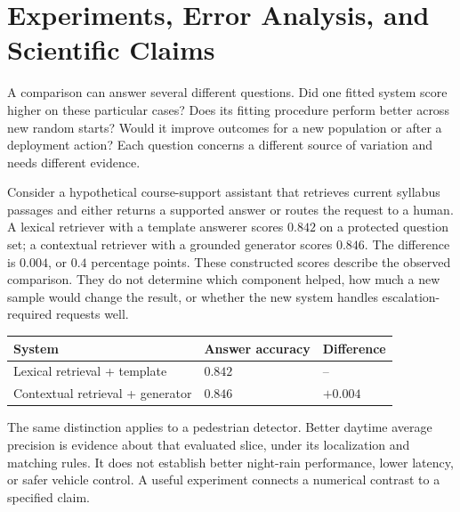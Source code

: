 \begingroup
\raggedbottom
{}
\chapter{Experiments, Error Analysis, and Scientific Claims}
\label{ch:experiments-claims}

A comparison can answer several different questions. Did one fitted system score higher on these particular cases? Does its fitting procedure perform better across new random starts? Would it improve outcomes for a new population or after a deployment action? Each question concerns a different source of variation and needs different evidence.

Consider a hypothetical course-support assistant that retrieves current syllabus passages and either returns a supported answer or routes the request to a human. A lexical retriever with a template answerer scores $0.842$ on a protected question set; a contextual retriever with a grounded generator scores $0.846$. The difference is $0.004$, or $0.4$ percentage points. These constructed scores describe the observed comparison. They do not determine which component helped, how much a new sample would change the result, or whether the new system handles escalation-required requests well.

\par\addvspace{\intextsep}\noindent\begin{minipage}{\linewidth}
\centering\small
\begin{tabular}{@{}L{5.6cm}L{2.3cm}L{1.8cm}@{}}
\toprule
System & Answer accuracy & Difference \\
\midrule
Lexical retrieval + template & $0.842$ & -- \\
Contextual retrieval + generator & $0.846$ & $+0.004$ \\
\bottomrule
\end{tabular}
\label{tab:score-improved-so-what}
\end{minipage}\par\addvspace{\intextsep}

The same distinction applies to a pedestrian detector. Better daytime average precision is evidence about that evaluated slice, under its localization and matching rules. It does not establish better night-rain performance, lower latency, or safer vehicle control. A useful experiment connects a numerical contrast to a specified claim.

